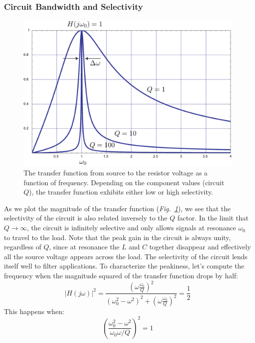 \subsubsection{Circuit Bandwidth and Selectivity}
\begin{figure}
\centering
\includegraphics[width=.65\columnwidth]{transferrlc}
\caption{The transfer function from source to the resistor voltage as a function of frequency.  Depending on the component values (circuit $Q$), the transfer function exhibits either low or high selectivity.} \label{fig:transferrlc}
\end{figure}
As we plot the magnitude of the transfer function (\emph{Fig.~\ref{fig:transferrlc}}), we see that the selectivity of the circuit is also related inversely to the $Q$ factor.  
In the limit that $Q \rightarrow \infty$, the circuit is infinitely selective and only allows signals at resonance $\omega_0$ to travel to the load.  Note that the peak gain in the circuit is always unity, regardless of $Q$, since at resonance the $L$ and $C$ together disappear and effectively all the source voltage appears across the load.  The selectivity of the circuit lends itself well to filter applications.  To characterize the peakiness, let's compute the frequency when the magnitude squared of the transfer function drops by half:
    \begin{equation}
        | H(j\omega)|^2 = \frac{ \left(\omega \frac{\omega_0}{Q} \right)^2}{\left( \omega_0^2 - \omega^2\right)^2 + \left( \omega \frac{\omega_0}{Q}\right)^2} = \frac{1}{2}
    \end{equation}
This happens when:
    \begin{equation}
        \left( \frac{\omega_0^2 - \omega^2}{\omega_0\omega / Q}\right)^2 = 1
    \end{equation}
